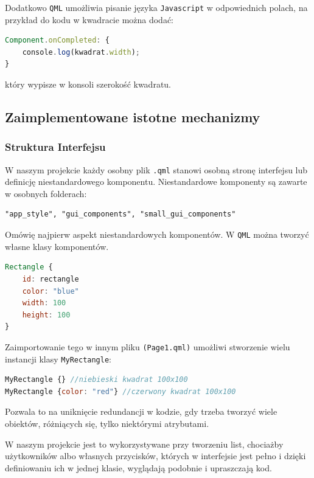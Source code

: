 Dodatkowo \texttt{QML} umożliwia pisanie języka \texttt{Javascript} w odpowiednich polach,
na przykład do kodu w kwadracie można dodać:

\begin{lstlisting}[language=QML, caption={Przykładowy Javascript}]
Component.onCompleted: {
    console.log(kwadrat.width);
}
\end{lstlisting}
który wypisze w konsoli szerokość kwadratu.


\subsection{Zaimplementowane istotne mechanizmy}
\label{sec:ZaimplementowaneIstotneMechanizmy}

\subsubsection{Struktura Interfejsu}
\label{sec:Struktura Interfejsu}
W naszym projekcie każdy osobny plik \texttt{.qml} stanowi osobną stronę interfejsu lub
definicję niestandardowego komponentu. Niestandardowe komponenty są zawarte
w osobnych folderach: 
\begin{lstlisting}
"app_style", "gui_components", "small_gui_components"
\end{lstlisting}

Omówię najpierw aspekt niestandardowych komponentów. W \texttt{QML} można tworzyć własne klasy komponentów.

\begin{lstlisting}[language=QML, caption={Przykładowa klasa w MyRectangle.qml}]
Rectangle {
    id: rectangle
    color: "blue"
    width: 100
    height: 100
}
\end{lstlisting}
Zaimportowanie tego w innym pliku \texttt{(Page1.qml)} umożliwi stworzenie
wielu instancji klasy \texttt{MyRectangle}:

\begin{lstlisting}[language=QML, caption={Przykładowe użycie klasy MyRectangle}]
MyRectangle {} //niebieski kwadrat 100x100
MyRectangle {color: "red"} //czerwony kwadrat 100x100
\end{lstlisting}
Pozwala to na uniknięcie redundancji w kodzie, gdy trzeba tworzyć
wiele obiektów, różniących się, tylko niektórymi atrybutami.

W naszym projekcie jest to wykorzystywane przy tworzeniu list, chociażby
użytkowników albo własnych przycisków, których w interfejsie jest pełno i dzięki definiowaniu ich w jednej klasie, wyglądają podobnie i upraszczają kod.

